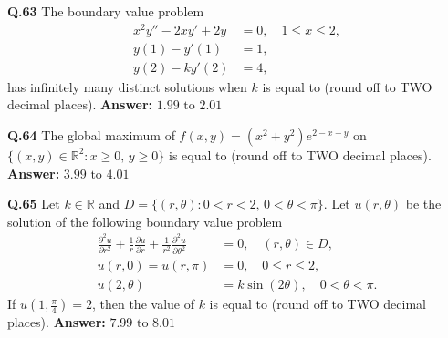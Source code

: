 \documentclass[11pt,a4paper]{article}
\newcommand{\ans}[1]{\textbf{Answer:} #1\par\medskip}
\begin{document}
\textbf{Q.63} The boundary value problem
\begin{align*}
  x^2 y'' - 2x y' + 2y &= 0, \quad 1 \le x \le 2, \\
  y(1) - y'(1) &= 1, \\
  y(2) - k y'(2) &= 4,
\end{align*}
has infinitely many distinct solutions when $k$ is equal to \underline{\hspace{2cm}} (round off to TWO decimal places).
\ans{$1.99 \text{ to } 2.01$}

\textbf{Q.64} The global maximum of $f(x, y) = (x^2 + y^2) e^{2 - x - y}$ on $\{(x, y) \in \mathbb{R}^2 : x \ge 0, \, y \ge 0\}$ is equal to \underline{\hspace{2cm}} (round off to TWO decimal places).
\ans{$3.99 \text{ to } 4.01$}

\textbf{Q.65} Let $k \in \mathbb{R}$ and $D = \{(r, \theta) : 0 < r < 2, \, 0 < \theta < \pi\}$. Let $u(r, \theta)$ be the solution of the following boundary value problem
\begin{align*}
  \frac{\partial^2 u}{\partial r^2} + \frac{1}{r} \frac{\partial u}{\partial r} + \frac{1}{r^2} \frac{\partial^2 u}{\partial \theta^2} &= 0, \quad (r, \theta) \in D, \\
  u(r, 0) = u(r, \pi) &= 0, \quad 0 \le r \le 2, \\
  u(2, \theta) &= k \sin(2\theta), \quad 0 < \theta < \pi.
\end{align*}
If $u\!\left(1, \frac{\pi}{4}\right) = 2$, then the value of $k$ is equal to \underline{\hspace{2cm}} (round off to TWO decimal places).
\ans{$7.99 \text{ to } 8.01$}
\end{document}
